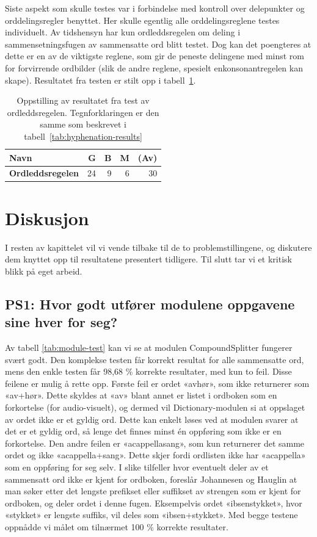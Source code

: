 Siste aspekt som skulle testes var i forbindelse med kontroll over delepunkter og orddelingsregler benyttet. Her skulle egentlig alle orddelingsreglene testes individuelt. Av tidshensyn har kun ordleddsregelen om deling i sammensetningsfugen av sammensatte ord blitt testet. Dog kan det poengteres at dette er en av de viktigste reglene, som gir de peneste delingene med minst rom for forvirrende ordbilder (slik de andre reglene, spesielt enkonsonantregelen kan skape). Resultatet fra testen er stilt opp i tabell~\ref{tab:ordleddsregelen}.

\begin{table}[h]
	\centering 
	\begin{tabular}{lrrrr} \hline 
		\textbf{Navn} & \textbf{G} & \textbf{B} & \textbf{M} & \textbf{(Av)} \\
		\hline \textbf{Ordleddsregelen} & 24 & 9 & 6 & 30 \\
		\hline 
	\end{tabular}
	\caption[Resultater fra test av ordleddsregelen]{Oppstilling av resultatet fra test av ordleddsregelen. Tegnforklaringen er den samme som beskrevet i tabell~\ref{tab:hyphenation-results}} \label{tab:ordleddsregelen} 
\end{table}

\section{Diskusjon}

I resten av kapittelet vil vi vende tilbake til de to problemstillingene, og diskutere dem knyttet opp til resultatene presentert tidligere. Til slutt tar vi et kritisk blikk på eget arbeid.

\subsection{PS1: Hvor godt utfører modulene oppgavene sine hver for seg?}
\label{sec:disk-ps1}

Av tabell \ref{tab:module-test} kan vi se at modulen CompoundSplitter fungerer svært godt. Den komplekse testen får korrekt resultat for alle sammensatte ord, mens den enkle testen får 98,68 \% korrekte resultater, med kun to feil. Disse feilene er mulig å rette opp. Første feil er ordet «avhør», som ikke returnerer som «av+hør». Dette skyldes at «av» blant annet er listet i ordboken som en forkortelse (for audio-visuelt), og dermed vil Dictionary-modulen si at oppslaget av ordet ikke er et gyldig ord. Dette kan enkelt løses ved at modulen svarer at det er et gyldig ord, så lenge det finnes minst én oppføring som ikke er en forkortelse. Den andre feilen er «acappellasang», som kun returnerer det samme ordet og ikke «acappella+sang». Dette skjer fordi ordlisten ikke har «acappella» som en oppføring for seg selv. I slike tilfeller hvor eventuelt deler av et sammensatt ord ikke er kjent for ordboken, foreslår Johannesen og Hauglin at man søker etter det lengste prefikset eller suffikset av strengen som er kjent for ordboken, og deler ordet i denne fugen. Eksempelvis ordet «ibsenstykket», hvor «stykket» er lengste suffiks, vil deles som «ibsen+stykket». Med begge testene oppnådde vi målet om tilnærmet 100 \% korrekte resultater.

